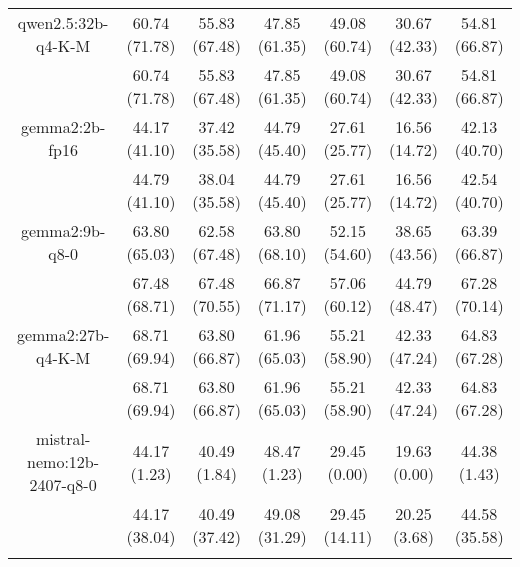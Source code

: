 \begin{table}[]
{\begin{tabular}{ccccccc}
        \multicolumn{1}{c|}{qwen2.5:32b-q4-K-M} & 60.74 (71.78) & 55.83 (67.48) & \multicolumn{1}{c|}{47.85 (61.35)} & 49.08 (60.74) & \multicolumn{1}{c|}{30.67 (42.33)} & 54.81 (66.87) \\
        
        

        \multicolumn{1}{c|}{} & 60.74 (71.78) & 55.83 (67.48) & \multicolumn{1}{c|}{47.85 (61.35)} & 49.08 (60.74) & \multicolumn{1}{c|}{30.67 (42.33)} & 54.81 (66.87) \\
        \cline{1-7}
        

        \multicolumn{1}{c|}{gemma2:2b-fp16} & 44.17 (41.10) & 37.42 (35.58) & \multicolumn{1}{c|}{44.79 (45.40)} & 27.61 (25.77) & \multicolumn{1}{c|}{16.56 (14.72)} & 42.13 (40.70) \\
        
        

        \multicolumn{1}{c|}{} & 44.79 (41.10) & 38.04 (35.58) & \multicolumn{1}{c|}{44.79 (45.40)} & 27.61 (25.77) & \multicolumn{1}{c|}{16.56 (14.72)} & 42.54 (40.70) \\
        \cline{1-7}
        

        \multicolumn{1}{c|}{gemma2:9b-q8-0} & 63.80 (65.03) & 62.58 (67.48) & \multicolumn{1}{c|}{63.80 (68.10)} & 52.15 (54.60) & \multicolumn{1}{c|}{38.65 (43.56)} & 63.39 (66.87) \\
        
        

        \multicolumn{1}{c|}{} & 67.48 (68.71) & 67.48 (70.55) & \multicolumn{1}{c|}{66.87 (71.17)} & 57.06 (60.12) & \multicolumn{1}{c|}{44.79 (48.47)} & 67.28 (70.14) \\
        \cline{1-7}
        

        \multicolumn{1}{c|}{gemma2:27b-q4-K-M} & 68.71 (69.94) & 63.80 (66.87) & \multicolumn{1}{c|}{61.96 (65.03)} & 55.21 (58.90) & \multicolumn{1}{c|}{42.33 (47.24)} & 64.83 (67.28) \\
        
        

        \multicolumn{1}{c|}{} & 68.71 (69.94) & 63.80 (66.87) & \multicolumn{1}{c|}{61.96 (65.03)} & 55.21 (58.90) & \multicolumn{1}{c|}{42.33 (47.24)} & 64.83 (67.28) \\
        \cline{1-7}
        

        \multicolumn{1}{c|}{mistral-nemo:12b-2407-q8-0} & 44.17 (1.23) & 40.49 (1.84) & \multicolumn{1}{c|}{48.47 (1.23)} & 29.45 (0.00) & \multicolumn{1}{c|}{19.63 (0.00)} & 44.38 (1.43) \\
        
        

        \multicolumn{1}{c|}{} & 44.17 (38.04) & 40.49 (37.42) & \multicolumn{1}{c|}{49.08 (31.29)} & 29.45 (14.11) & \multicolumn{1}{c|}{20.25 (3.68)} & 44.58 (35.58) \\
        \cline{1-7}
        
\\ \hline
\end{tabular}%
}
\end{table}
    